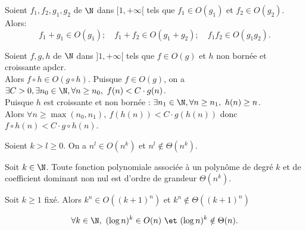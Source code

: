 \documentclass[french, 11pt]{article}
\begin{document}
\vspace*{-0.3cm}

\begin{prop}{}{}
    Soient $f_1,f_2,g_1,g_2$ de $\N$ dans $[1,+\infty[$ tels que $f_1\in O(g_1)$ et $f_2\in O(g_2)$. Alors:
    \begin{equation*}
        f_1+g_1\in O(g_1); \quad f_1+f_2\in O(g_1+g_2); \quad f_1f_2 \in O(g_1g_2).
    \end{equation*}
\end{prop}

\vspace*{-0.3cm}

\begin{prop}{}{}
    Soient $f,g,h$ de $\N$ dans $]1,+\infty[$ tels que $f\in O(g)$ et $h$ non bornée et croissante apdcr.\\
    Alors $f\circ h\in O(g\circ h)$.
    \tcblower
    Puisque $f\in O(g)$, on a $\exists C>0,\exists n_0\in\N, \forall n \geq n_0, ~ f(n)<C\cdot g(n)$.\\
    Puisque $h$ est croissante et non bornée : $\exists n_1\in\N, \forall n \geq n_1, ~ h(n)\geq n$.\\
    Alors $\forall n \geq \max(n_0,n_1), ~ f(h(n))<C\cdot g(h(n))$ donc $f\circ h(n) < C\cdot g\circ h(n)$.
\end{prop}

\vspace*{-0.3cm}

\begin{corr}{}{}
    Soient $k>l\geq0$. On a $n^l\in O(n^k)$ et $n^l\notin\Theta(n^k)$.
\end{corr}

\vspace*{-0.3cm}

\begin{corr}{}{}
    Soit $k\in\N$. Toute fonction polynomiale associée à un polynôme de degré $k$ et de coefficient dominant non nul est d'ordre de grandeur $\Theta(n^k)$.
\end{corr}

\vspace*{-0.3cm}

\begin{corr}{}{}
    Soit $k\geq1$ fixé. Alors $k^n\in O((k+1)^n)$ et $k^n\notin\Theta((k+1)^n)$
\end{corr}

\vspace*{-0.3cm}

\begin{prop}{}{}
    \begin{equation*}
        \forall k \in \N, ~ (\log n)^k \in O(n) ~ \et ~ (\log n)^k \notin \Theta(n).
    \end{equation*}
\end{prop}
\end{document}
